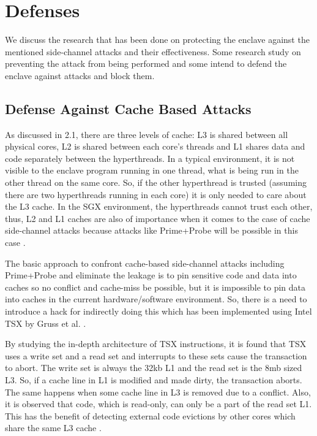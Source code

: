 \section{Defenses}
We discuss the research that has been done on protecting the enclave against the mentioned side-channel attacks and their effectiveness. Some research study on preventing the attack from being performed and some intend to defend the enclave against attacks and block them.

\subsection{Defense Against Cache Based Attacks}
As discussed in 2.1, there are three levels of cache: L3 is shared between all physical cores, L2 is shared between each core's threads and L1 shares data and code separately between the hyperthreads. In a typical environment, it is not visible to the enclave program running in one thread, what is being run in the other thread on the same core. So, if the other hyperthread is trusted (assuming there are two hyperthreads running in each core) it is only needed to care about the L3 cache. In the SGX environment, the hyperthreads cannot trust each other, thus, L2 and L1 caches are also of importance when it comes to the case of cache side-channel attacks because attacks like Prime+Probe will be possible in this case \cite{cloak}.

The basic approach to confront cache-based side-channel attacks including Prime+Probe and eliminate the leakage is to pin sensitive code and data into caches so no conflict and cache-miss be possible, but it is impossible to pin data into caches in the current hardware/software environment. So, there is a need to introduce a hack for indirectly doing this which has been implemented using Intel TSX by Gruss et al. \cite{cloak}.

By studying the in-depth architecture of TSX instructions, it is found that TSX uses a write set and a read set and interrupts to these sets cause the transaction to abort. The write set is always the 32kb L1 and the read set is the 8mb sized L3. So, if a cache line in L1 is modified and made dirty, the transaction aborts. The same happens when some cache line in L3 is removed due to a conflict. Also, it is observed that code, which is read-only, can only be a part of the read set L1. This has the benefit of detecting external code evictions by other cores which share the same L3 cache \cite{cloak}.


